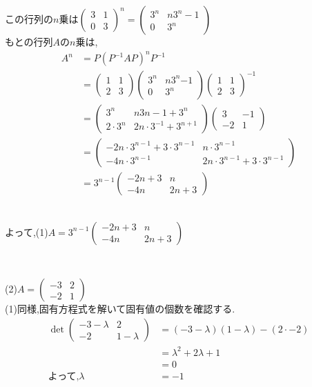 \documentclass{jsarticle}
\begin{document}
この行列の$n$乗は$\begin{pmatrix}3&1\\0&3\end{pmatrix} ^n = \begin{pmatrix}3^n&n3^n-1\\0&3^n \end{pmatrix}$\\
もとの行列$A$の$n$乗は,
\begin{align*}
  A^n &= P(P^{-1}AP)^n P^{-1}\\
      &= \begin{pmatrix}1&1\\2&3\end{pmatrix} \begin{pmatrix}3^n&n3^n{-1}\\0&3^n \end{pmatrix} \begin{pmatrix}1&1\\2&3\end{pmatrix}^{-1}\\  
      &= \begin{pmatrix}3^n&n3{n-1}+3^{n}\\2\cdot 3^n&2n\cdot 3^{-1}+3^{n+1}\end{pmatrix} \begin{pmatrix}3&-1\\-2&1 \end{pmatrix}\\
      &= \begin{pmatrix}-2n\cdot 3^{n-1}+3\cdot 3^{n-1}&n\cdot 3^{n-1}\\-4n\cdot 3^{n-1}&2n\cdot 3^{n-1}+3\cdot 3^{n-1}\end{pmatrix}\\
      &= 3^{n-1}\begin{pmatrix}-2n+3&n\\-4n&2n+3\end{pmatrix}
\end{align*}

\leavevmode\\
\raggedleft よって,(1)$A = 3^{n-1}\begin{pmatrix}-2n+3&n\\-4n&2n+3\end{pmatrix}$

\leavevmode\\
\raggedright (2)$A = \begin{pmatrix}-3 & 2 \\-2 & 1\end{pmatrix}$ 
\leavevmode\\
(1)同様,固有方程式を解いて固有値の個数を確認する.
\begin{align*}
  \det \begin{pmatrix} -3-\lambda &2\\-2&1-\lambda \end{pmatrix} 
  &=(-3-\lambda)(1-\lambda)-(2\cdot -2)\\
  &=\lambda ^2 +2\lambda +1\\
  &=0\\
\text{よって,}
\lambda &= -1
\end{align*}
\end{document}
